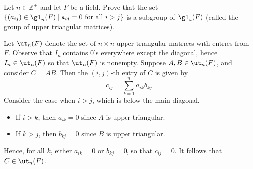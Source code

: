 \begin{exercise} \label{ex2.1.16}
    Let $n \in \mathbb{Z}^+$ and let $F$ be a field. Prove that the set $\{ (a_{ij}) \in \gl_n(F) \mid a_{ij} = 0 \text{ for all } i > j \}$ is a subgroup of $\gl_n(F)$ (called the group of upper triangular matrices).
\end{exercise}

\begin{sol}
    Let $\ut_n(F)$ denote the set of $n \times n$ upper triangular matrices with entries from $F$. Observe that $I_n$ contains $0$'s everywhere except the diagonal, hence $I_n \in \ut_n(F)$ so that $\ut_n(F)$ is nonempty. Suppose $A, B \in \ut_n(F)$, and consider $C = AB$. Then the $(i, j)$-th entry of $C$ is given by
    \[c_{ij} = \sum_{k = 1}^n a_{ik}b_{kj}\]
    Consider the case when $i > j$, which is below the main diagonal.
    \begin{itemize}
        \item If $i > k$, then $a_{ik} = 0$ since $A$ is upper triangular.
        \item If $k > j$, then $b_{kj} = 0$ since $B$ is upper triangular.
    \end{itemize}
    Hence, for all $k$, either $a_{ik} = 0$ or $b_{kj} = 0$, so that $c_{ij} = 0$. It follows that $C \in \ut_n(F)$.


\end{sol}
